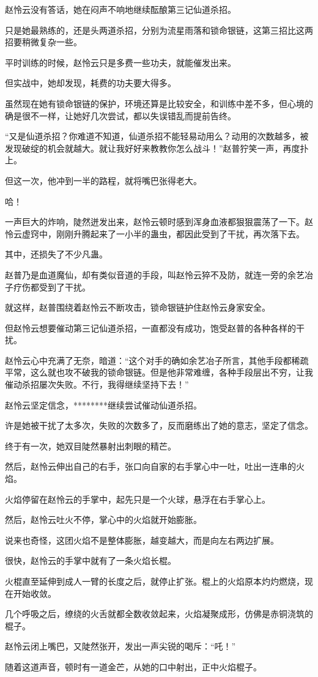 \begin{this_body}
赵怜云没有答话，她在闷声不响地继续酝酿第三记仙道杀招。

只是她最熟练的，还是头两道杀招，分别为流星雨落和锁命银链，这第三招比这两招要稍微复杂一些。

平时训练的时候，赵怜云只是多费一些功夫，就能催发出来。

但实战中，她却发现，耗费的功夫要大得多。

虽然现在她有锁命银链的保护，环境还算是比较安全，和训练中差不多，但心境的确是很不一样，让她好几次尝试，都以失误错乱而提前告终。

“又是仙道杀招？你难道不知道，仙道杀招不能轻易动用么？动用的次数越多，被发现破绽的机会就越大。就让我好好来教教你怎么战斗！”赵普狞笑一声，再度扑上。

但这一次，他冲到一半的路程，就将嘴巴张得老大。

哈！

一声巨大的炸响，陡然迸发出来，赵怜云顿时感到浑身血液都狠狠震荡了一下。赵怜云虚窍中，刚刚升腾起来了一小半的蛊虫，都因此受到了干扰，再次落下去。

其中，还损失了不少凡蛊。

赵普乃是血道魔仙，却有类似音道的手段，叫赵怜云猝不及防，就连一旁的余艺冶子疗伤都受到了干扰。

就这样，赵普围绕着赵怜云不断攻击，锁命银链护住赵怜云身家安全。

但赵怜云想要催动第三记仙道杀招，一直都没有成功，饱受赵普的各种各样的干扰。

赵怜云心中充满了无奈，暗道：“这个对手的确如余艺冶子所言，其他手段都稀疏平常，这么就也攻不破我的锁命银链。但是他非常难缠，各种手段层出不穷，让我催动杀招屡次失败。不行，我得继续坚持下去！”

赵怜云坚定信念，********继续尝试催动仙道杀招。

许是她被干扰了太多次，失败的次数多了，反而磨练出了她的意志，坚定了信念。

终于有一次，她双目陡然暴射出刺眼的精芒。

然后，赵怜云伸出自己的右手，张口向自家的右手掌心中一吐，吐出一连串的火焰。

火焰停留在赵怜云的手掌中，起先只是一个火球，悬浮在右手掌心上。

然后，赵怜云吐火不停，掌心中的火焰就开始膨胀。

说来也奇怪，这团火焰不是整体膨胀，越变越大，而是向左右两边扩展。

很快，赵怜云的手掌中就有了一条火焰长棍。

火棍直至延伸到成人一臂的长度之后，就停止扩张。棍上的火焰原本灼灼燃烧，现在开始收敛。

几个呼吸之后，缭绕的火舌就都全数收敛起来，火焰凝聚成形，仿佛是赤铜浇筑的棍子。

赵怜云闭上嘴巴，又陡然张开，发出一声尖锐的喝斥：“吒！”

随着这道声音，顿时有一道金芒，从她的口中射出，正中火焰棍子。

\end{this_body}

